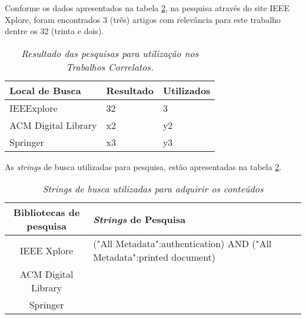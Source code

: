 Conforme os dados apresentados na tabela \ref{table:busca}, na pesquisa através do site IEEE Xplore, foram encontrados 3 (três) artigos com relevância para este trabalho dentre os 32 (trinta e dois).

\begin{table}[h]
    \centering
    \begin{tabular}{| m{3cm} | m{3cm} | m{3cm} |} \hline
       Local de Busca      & Resultado & Utilizados  \\ \hline
       
       IEEExplore          & 32        &  3          \\ \hline
       ACM Digital Library & x2        &  y2         \\ \hline
       Springer            & x3        &  y3         \\ \hline
    \end{tabular}
    \caption[Resultado das pesquisas]{\textit{Resultado das pesquisas para utilização nos Trabalhos Correlatos.}}
    \label{table:busca}
\end{table} 

\newpage
As \textit{strings} de busca utilizadas para pesquisa, estão apresentadas na tabela \ref{table:busca}.
\begin{table}[h]
\centering
   \begin{tabular}{|c|m{6cm}|l|l|}
   \hline
      Bibliotecas de pesquisa & \textit{Strings} de Pesquisa        \\ \hline
          
      IEEE Xplore             & ("All Metadata":authentication) AND ("All Metadata":printed document)
      \\ \hline
      ACM Digital Library     &                                     
      \\ \hline
      Springer                &                                     
      \\ \hline
   \end{tabular} 
   \caption[Strings de busca]{\textit{Strings de busca utilizadas para adquirir os conteúdos}}
   \label{table:busca}
\end{table}